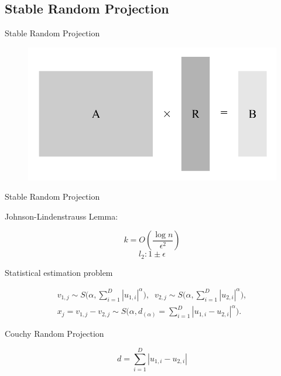 \documentclass[ignorenonframetext,]{beamer}
\begin{document}
\subsection{Stable Random Projection}\label{stable-random-projection-1}

\begin{frame}{Stable Random Projection}

\begin{figure}
\centering
\includegraphics{pics/10.png}
\caption{}
\end{figure}

\end{frame}

\begin{frame}{Stable Random Projection}

Johnson-Lindenstrauss Lemma:

\[ k = O \left ( \frac{\log n}{\epsilon^2 } \right ) \]
\[ l_2: 1 \pm \epsilon\]

\end{frame}

\begin{frame}{Statistical estimation problem}

\begin{align}
v_{1,j} \sim S \bigg( \alpha, \sum_{i=1}^D |u_{1,i}|^\alpha \bigg), \;\;
v_{2,j} \sim S \bigg( \alpha, \sum_{i=1}^D |u_{2,i}|^\alpha \bigg),\\
x_j = v_{1,j} - v_{2,j} \sim S \bigg( \alpha, d_{(\alpha)} = 
\sum_{i=1}^D | u_{1,i} - u_{2,i} |^\alpha \bigg).
\end{align}

\end{frame}

\begin{frame}{Couchy Random Projection}

\[d = \sum_{i=1}^D | u_{1,i} - u_{2,i} | \]

\end{frame}
\end{document}
